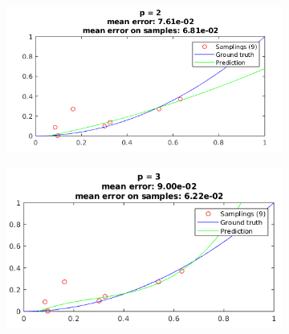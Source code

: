 \documentclass[12pt]{article}
\begin{document}
\begin{figure}[H]
  \centering
  \begin{subfigure}{0.45\textwidth}
    \includegraphics[width=\textwidth]{plots/regression/p_eq_2.png}
  \end{subfigure}
  \begin{subfigure}{0.45\textwidth}
    \includegraphics[width=\textwidth]{plots/regression/p_eq_3.png}
  \end{subfigure}
\end{figure}
\end{document}
